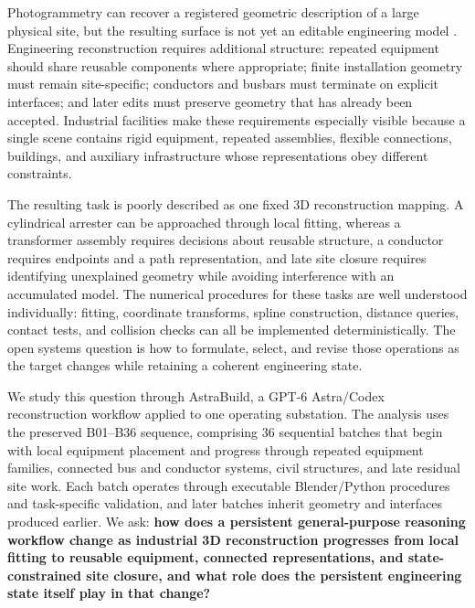 \documentclass[10pt,a4paper]{article}
\begin{document}
Photogrammetry can recover a registered geometric description of a large
physical site, but the resulting surface is not yet an editable
engineering model \citep{schonberger2016sfm}. Engineering reconstruction
requires additional structure: repeated equipment should share reusable
components where appropriate; finite installation geometry must remain
site-specific; conductors and busbars must terminate on explicit
interfaces; and later edits must preserve geometry that has already been
accepted. Industrial facilities make these requirements especially
visible because a single scene contains rigid equipment, repeated
assemblies, flexible connections, buildings, and auxiliary
infrastructure whose representations obey different constraints.

The resulting task is poorly described as one fixed 3D reconstruction
mapping. A cylindrical arrester can be approached through local fitting,
whereas a transformer assembly requires decisions about reusable
structure, a conductor requires endpoints and a path representation, and
late site closure requires identifying unexplained geometry while
avoiding interference with an accumulated model. The numerical
procedures for these tasks are well understood individually: fitting,
coordinate transforms, spline construction, distance queries, contact
tests, and collision checks can all be implemented deterministically.
The open systems question is how to formulate, select, and revise those
operations as the target changes while retaining a coherent engineering
state.

We study this question through AstraBuild, a GPT-6 Astra/Codex
reconstruction workflow applied to one operating substation. The
analysis uses the preserved B01--B36 sequence, comprising 36 sequential
batches that begin with local equipment placement and progress through
repeated equipment families, connected bus and conductor systems, civil
structures, and late residual site work. Each batch operates through
executable Blender/Python procedures and task-specific validation, and
later batches inherit geometry and interfaces produced earlier. We ask:
\textbf{how does a persistent general-purpose reasoning workflow change
as industrial 3D reconstruction progresses from local fitting to
reusable equipment, connected representations, and state-constrained
site closure, and what role does the persistent engineering state itself
play in that change?}
\end{document}
